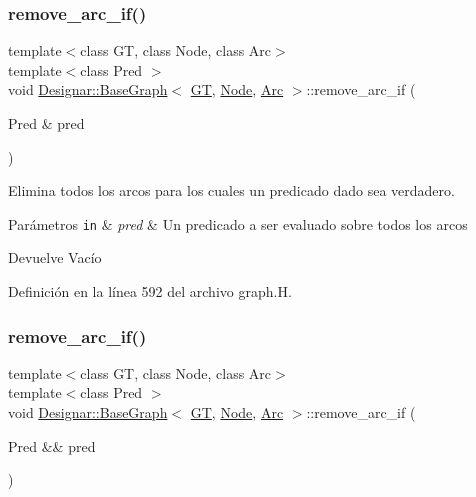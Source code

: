 \subsubsection{\texorpdfstring{remove\+\_\+arc\+\_\+if()}{remove\_arc\_if()}\hspace{0.1cm}{\footnotesize\ttfamily [1/2]}}
{\footnotesize\ttfamily template$<$class GT, class Node, class Arc$>$ \\
template$<$class Pred $>$ \\
void \hyperlink{class_designar_1_1_base_graph}{Designar\+::\+Base\+Graph}$<$ \hyperlink{demo-buildgraph_8_c_a3001c40d2c31ca87ed96cd7d1334a55e}{GT}, \hyperlink{namespace_designar_a5af326c65aa2bd26b26c410f2030d09e}{Node}, \hyperlink{namespace_designar_a3f55fb5513d62ff47cbc8f72b8e95d6f}{Arc} $>$\+::remove\+\_\+arc\+\_\+if (\begin{DoxyParamCaption}\item[{Pred \&}]{pred }\end{DoxyParamCaption})\hspace{0.3cm}{\ttfamily [inline]}}



Elimina todos los arcos para los cuales un predicado dado sea verdadero. 


\begin{DoxyParams}[1]{Parámetros}
\mbox{\tt in}  & {\em pred} & Un predicado a ser evaluado sobre todos los arcos \\
\hline
\end{DoxyParams}
\begin{DoxyReturn}{Devuelve}
Vacío 
\end{DoxyReturn}


Definición en la línea 592 del archivo graph.\+H.

\mbox{\label{class_designar_1_1_base_graph_a0e516bee6e0247de6bdd207de57caad6}} 
\subsubsection{\texorpdfstring{remove\+\_\+arc\+\_\+if()}{remove\_arc\_if()}\hspace{0.1cm}{\footnotesize\ttfamily [2/2]}}
{\footnotesize\ttfamily template$<$class GT, class Node, class Arc$>$ \\
template$<$class Pred $>$ \\
void \hyperlink{class_designar_1_1_base_graph}{Designar\+::\+Base\+Graph}$<$ \hyperlink{demo-buildgraph_8_c_a3001c40d2c31ca87ed96cd7d1334a55e}{GT}, \hyperlink{namespace_designar_a5af326c65aa2bd26b26c410f2030d09e}{Node}, \hyperlink{namespace_designar_a3f55fb5513d62ff47cbc8f72b8e95d6f}{Arc} $>$\+::remove\+\_\+arc\+\_\+if (\begin{DoxyParamCaption}\item[{Pred \&\&}]{pred }\end{DoxyParamCaption})\hspace{0.3cm}{\ttfamily [inline]}}



